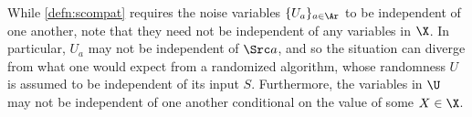 While \cref{defn:scompat} requires the noise variables $\{ U_a \}_{a \in \Ar}$ to be independent of one another, note that they need not be independent of any variables in $\X$.
%
In particular, $U_a$ may not be independent of $\Src a$,
and so 
the situation can diverge from what one would expect from a randomized algorithm, whose
randomness $U$ is assumed to be independent of its input 
$S$. 
Furthermore, the variables in $\U$ may not be independent of one another conditional on the value of some $X \in \X$. 

